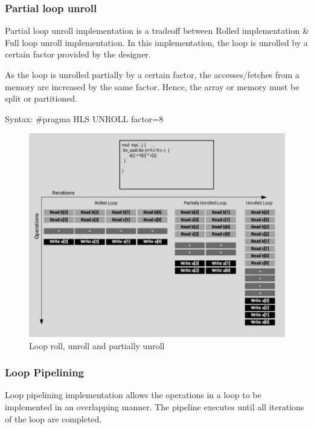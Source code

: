 \subsubsection{Partial loop unroll}
Partial loop unroll implementation is a tradeoff between Rolled implementation \& Full loop unroll implementation. In this implementation, the loop is unrolled by a certain factor provided by the designer.

\begin{highlight}
  As the loop is unrolled partially by a certain factor, the accesses/fetches from a memory are increased by the same factor. Hence, the array or memory must be split or partitioned.
\end{highlight}

Syntax: \#pragma HLS UNROLL factor=8

\begin{figure}[H]
	\begin{center}
		\includegraphics[width=\textwidth]{images/LoopRoll.png}
		\caption{Loop roll, unroll and partially unroll}
		\label{LoopRoll}
	\end{center}
\end{figure}

\subsubsection{Loop Pipelining}
Loop pipelining implementation allows the operations in a loop to be implemented in an overlapping manner. The pipeline executes until all iterations of the loop are completed.

